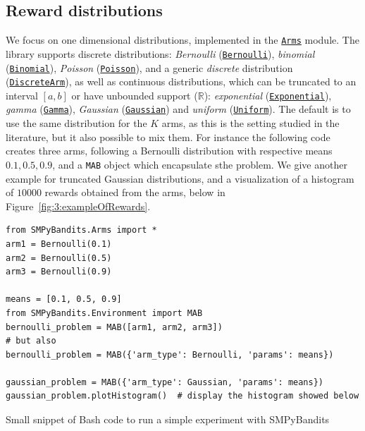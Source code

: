 \subsection{Reward distributions}
%
We focus on one dimensional distributions, implemented in the \texttt{\href{https://smpybandits.github.io/docs/Arms.html}{Arms}} module.
The library supports discrete distributions: \emph{Bernoulli} (\texttt{\href{https://smpybandits.github.io/docs/Arms.Bernoulli.html}{Bernoulli}}), \emph{binomial} (\texttt{\href{https://smpybandits.github.io/docs/Arms.Binomial.html}{Binomial}}), \emph{Poisson} (\texttt{\href{https://smpybandits.github.io/docs/Arms.Poisson.html}{Poisson}}), and a generic \emph{discrete} distribution (\texttt{\href{https://smpybandits.github.io/docs/Arms.DiscreteArm.html}{DiscreteArm}}),
as well as continuous distributions,
which can be truncated to an interval $[a,b]$ or have unbounded support ($\mathbb{R}$):
\emph{exponential} (\texttt{\href{https://smpybandits.github.io/docs/Arms.Exponential.html}{Exponential}}), \emph{gamma} (\texttt{\href{https://smpybandits.github.io/docs/Arms.Gamma.html}{Gamma}}), \emph{Gaussian} (\texttt{\href{https://smpybandits.github.io/docs/Arms.Gaussian.html}{Gaussian}}) and \emph{uniform} (\texttt{\href{https://smpybandits.github.io/docs/Arms.Uniform.html}{Uniform}}).
%
The default is to use the same distribution for the $K$ arms, as this is the setting studied in the literature,
but it also possible to mix them.
%
For instance the following code creates three arms, following a Bernoulli distribution with respective means $0.1, 0.5, 0.9$, and a \texttt{MAB} object which encapsulate sthe problem.
We give another example for truncated Gaussian distributions, and a visualization of a histogram of $10000$ rewards obtained from the arms, below in Figure~\ref{fig:3:exampleOfRewards}.

\begin{small}
\begin{listing}[h!]
    \begin{verbatim}
from SMPyBandits.Arms import *
arm1 = Bernoulli(0.1)
arm2 = Bernoulli(0.5)
arm3 = Bernoulli(0.9)

means = [0.1, 0.5, 0.9]
from SMPyBandits.Environment import MAB
bernoulli_problem = MAB([arm1, arm2, arm3])
# but also
bernoulli_problem = MAB({'arm_type': Bernoulli, 'params': means})

gaussian_problem = MAB({'arm_type': Gaussian, 'params': means})
gaussian_problem.plotHistogram()  # display the histogram showed below
    \end{verbatim}
    \caption{Small snippet of Bash code to run a simple experiment with SMPyBandits}
    \label{lst:3:howToRunBasicLibrary}
\end{listing}
\end{small}

